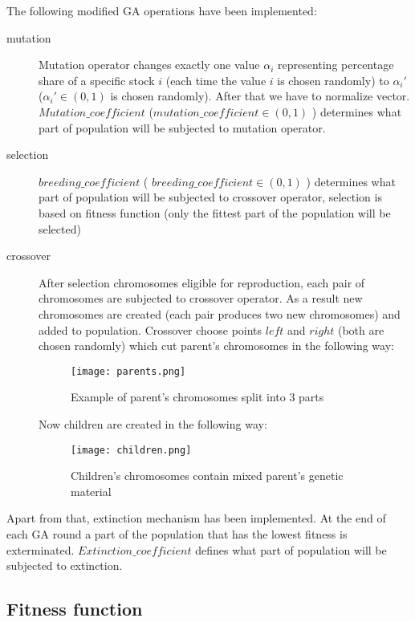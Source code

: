 The following modified GA operations have been implemented:
\begin{description}
  \item [mutation]
      Mutation operator changes exactly one value $ \alpha_{i} $ representing percentage share of a specific stock $i$ (each time the value $i$ is chosen randomly)
      to $\alpha_{i}'$ ($\alpha_{i}' \in (0,1)$ is chosen randomly). 
      After that we have to normalize vector.
      $Mutation\_coefficient$ ($mutation\_coefficient \in (0,1)$ ) determines what part of population will be subjected to mutation operator.
  \item [selection]
      $breeding\_coefficient$ ( $breeding\_coefficient \in (0,1)$ ) determines what part of population will be subjected to crossover operator, selection is based on 
      fitness function (only the fittest part of the population will be selected)
  \item [crossover]
      After selection chromosomes eligible for reproduction, each pair of chromosomes are subjected to crossover operator. As a result new chromosomes are created (each pair
      produces two new chromosomes) and added to population. Crossover choose points $left$  and $right$ (both are chosen randomly) which cut parent's chromosomes in the following
      way: 
	  \begin{figure}[H]
	    \begin{center}
	      \texttt{[image: parents.png]}
	    \end{center}
	    \caption{Example of parent's chromosomes split into 3 parts}
	  \end{figure}

	Now children are created in the following way:    
	  \begin{figure}[H]
	    \begin{center}
	      \texttt{[image: children.png]}
	    \end{center}
	    \caption{Children's chromosomes contain mixed parent's genetic material}
	  \end{figure}

\end{description}

Apart from that, extinction mechanism has been implemented.
At the end of each GA round a part of the population that has the lowest fitness is exterminated.
$Extinction\_coefficient$ defines what part of population will be subjected to extinction.
 
\subsection{Fitness function}

